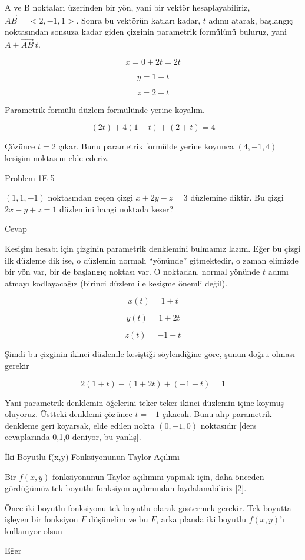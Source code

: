 \documentclass[12pt,fleqn]{article}\usepackage{../../common}
\begin{document}
A ve B noktaları üzerinden bir yön, yani bir vektör hesaplayabiliriz, $\vec{AB}
= <2,-1,1>$. Sonra bu vektörün katları kadar, $t$ adımı atarak, başlangıç
noktasından sonsuza kadar giden çizginin parametrik formülünü buluruz, yani $A +
\vec{AB} \ t$.

$$ x = 0 + 2t = 2t $$

$$ y = 1 - t $$

$$ z = 2 + t $$

Parametrik formülü düzlem formülünde yerine koyalım. 

$$ (2t) + 4(1-t) + (2+t) = 4 $$

Çözünce $t=2$ çıkar. Bunu parametrik formülde yerine koyunca $(4,-1,4)$
kesişim noktasını elde ederiz. 

Problem 1E-5 

$(1,1,-1)$ noktasından geçen çizgi $x+2y - z = 3$ düzlemine diktir. Bu
çizgi $2x - y + z = 1$ düzlemini hangi noktada keser? 

Cevap

Kesişim hesabı için çizginin parametrik denklemini bulmamız lazım. Eğer bu
çizgi ilk düzleme dik ise, o düzlemin normalı ``yönünde'' gitmektedir, o
zaman elimizde bir yön var, bir de başlangıç noktası var. O noktadan,
normal yönünde $t$ adımı atmayı kodlayacağız (birinci düzlem ile kesişme
önemli değil). 

$$ x(t) = 1 + t $$

$$ y(t) = 1 + 2t $$

$$ z(t) = -1 -t $$

Şimdi bu çizginin ikinci düzlemle kesiştiği söylendiğine göre, şunun doğru
olması gerekir

$$ 2(1+t) - (1+2t) + (-1-t) = 1 $$

Yani parametrik denklemin öğelerini teker teker ikinci düzlemin içine
koymuş oluyoruz. Üstteki denklemi çözünce $t=-1$ çıkacak. Bunu alıp
parametrik denkleme geri koyarsak, elde edilen nokta $(0,-1,0)$
noktasıdır [ders cevaplarında 0,1,0 deniyor, bu yanlış]. 

İki Boyutlu f(x,y) Fonksiyonunun Taylor Açılımı

Bir $f(x,y)$ fonksiyonunun Taylor açılımını yapmak için, daha önceden
gördüğümüz tek boyutlu fonksiyon açılımından faydalanabiliriz [2]. 

Önce iki boyutlu fonksiyonu tek boyutlu olarak göstermek gerekir. Tek
boyutta işleyen bir fonksiyon $F$ düşünelim ve bu $F$, arka planda iki
boyutlu $f(x,y)$'ı kullanıyor olsun

Eğer 
\end{document}
